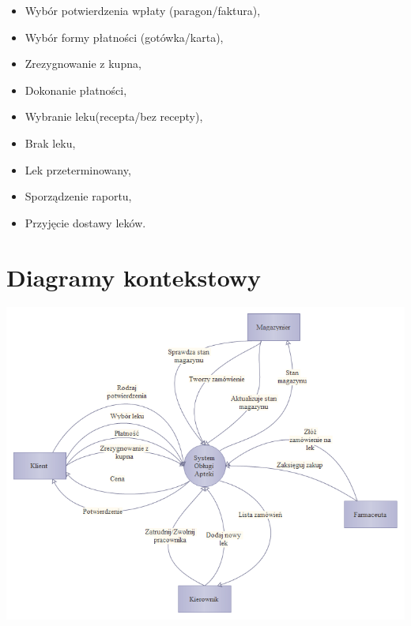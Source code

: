 \documentclass[a4paper, 11pt]{article}
\begin{document}
	\begin{itemize}
	\item Wybór potwierdzenia wpłaty (paragon/faktura),
	\item Wybór formy płatności (gotówka/karta),
	\item Zrezygnowanie z kupna,
	\item Dokonanie płatności,
	\item Wybranie leku(recepta/bez recepty),
	\item Brak leku,
	\item Lek przeterminowany,
	\item Sporządzenie raportu,
	\item Przyjęcie dostawy leków.
	\end{itemize}
	

	\section{Diagramy kontekstowy}
	\includegraphics[scale=0.8]{zd.PNG} 
\end{document}
